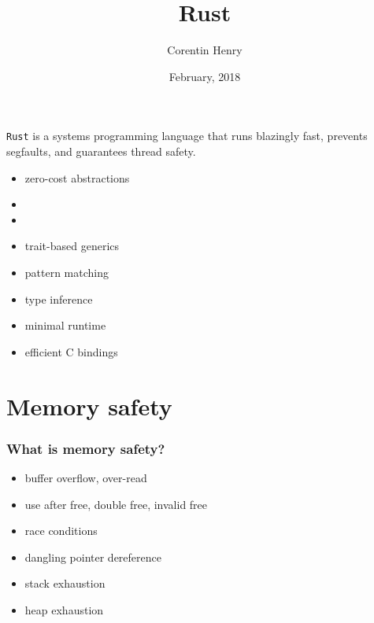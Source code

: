 \documentclass{beamer}
\begin{document}
{%
    \title{Rust}
    \author{Corentin Henry}
    \date{February, 2018}
    \frame{\titlepage}
}
\addtocounter{framenumber}{-2}

\begin{frame}
    \begin{center}
        \texttt{Rust} is a systems programming language that runs blazingly fast, prevents segfaults, and guarantees thread safety. 
    \end{center}
\end{frame}

\begin{frame}
    \begin{itemize}
        \item zero-cost abstractions
        \item {}
        \item {}
        \item trait-based generics
        \item pattern matching
        \item type inference
        \item minimal runtime
        \item efficient C bindings
    \end{itemize}
\end{frame}

\section{Memory safety}

\begin{frame}
    \frametitle{What is memory safety?}
    \begin{itemize}
        \item buffer overflow, over-read
        \item use after free, double free, invalid free
        \item race conditions
        \item dangling pointer dereference
        \item stack exhaustion
        \item heap exhaustion
    \end{itemize}
\end{frame}
\end{document}
